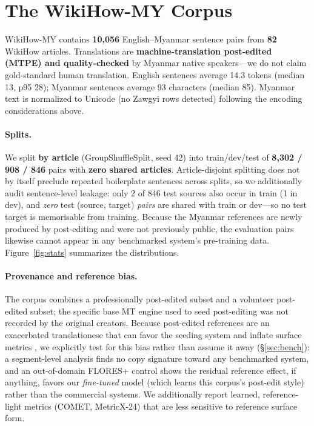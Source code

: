 \documentclass[11pt]{article}
\begin{document}
\section{The WikiHow-MY Corpus}\label{sec:corpus}
WikiHow-MY contains \textbf{10{,}056} English--Myanmar sentence pairs from \textbf{82}
WikiHow articles. Translations are \textbf{machine-translation post-edited (MTPE) and
quality-checked} by Myanmar native speakers---we do not claim gold-standard human
translation. English sentences average 14.3 tokens (median 13, p95 28); Myanmar sentences
average 93 characters (median 85). Myanmar text is normalized to Unicode (no Zawgyi rows
detected) following the encoding considerations above.

\paragraph{Splits.} We split \textbf{by article} (GroupShuffleSplit, seed 42) into
train/dev/test of \textbf{8{,}302 / 908 / 846} pairs with \textbf{zero shared articles}.
Article-disjoint splitting does not by itself preclude repeated boilerplate sentences across
splits, so we additionally audit sentence-level leakage: only 2 of 846 test sources also
occur in train (1 in dev), and \emph{zero} test (source, target) \emph{pairs} are shared with
train or dev---so no test target is memorisable from training. Because the Myanmar references
are newly produced by post-editing and were not previously public, the evaluation pairs likewise
cannot appear in any benchmarked system's pre-training data. Figure~\ref{fig:stats}
summarizes the distributions.

\paragraph{Provenance and reference bias.} The corpus combines a professionally post-edited
subset and a volunteer post-edited subset; the specific base MT engine used to seed
post-editing was not recorded by the original creators. Because post-edited references are an
exacerbated translationese that can favor the seeding system and inflate surface metrics
\citep{toral2019posteditese,freitag2020references,zhang2019translationese}, we explicitly test
for this bias rather than assume it away (\S\ref{sec:bench}): a segment-level analysis finds
no copy signature toward any benchmarked system, and an out-of-domain FLORES+ control shows
the residual reference effect, if anything, favors our \emph{fine-tuned} model (which learns
this corpus's post-edit style) rather than the commercial systems. We additionally report
learned, reference-light metrics (COMET, MetricX-24) that are less sensitive to reference
surface form.
\end{document}
